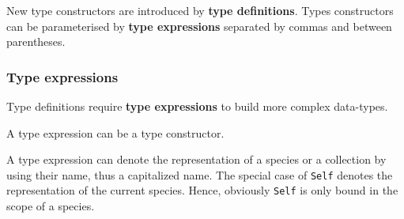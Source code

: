 New type constructors are introduced by
{\bf type definitions}.
Types constructors can be parameterised by  {\bf type expressions}
separated by commas and between parentheses.

\subsubsection{Type expressions}
Type definitions require {\bf type expressions} to build more complex
data-types.
\vspace{0.2cm}
\begin{syn}
 \is
\alt {}
\alt {}
\alt {}
\alt {} \tok{(}  \tok{)} %
\alt {} \tok{->} 
\alt \tok{(}  \tok{)}
\alt \tok{(}  \tok{)}
\end{syn}
\vspace{0.2cm}

A type expression can be a type constructor.

A type expression can denote the representation of a species or a
collection by using their name, thus a capitalized name. The special
case of {\tt Self} denotes the representation of the current
species. Hence, obviously {\tt Self} is only bound in the scope of a
species.

